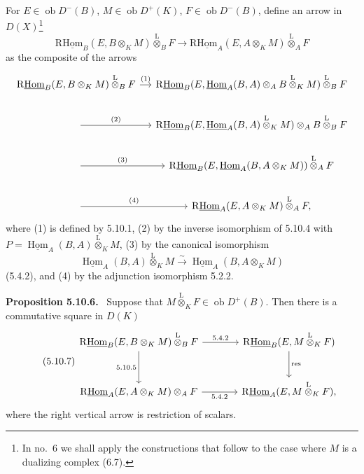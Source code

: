 \documentclass[11pt]{article}
\providecommand{\uHom}{\underline{\Hom}}
\newenvironment{statement}[1]{\par\medskip\noindent\textbf{#1.}\ }{\par\medskip}
\DeclareMathOperator{\Hom}{Hom}
\newcommand{\ob}{\operatorname{ob}}
\providecommand{\lten}{\overset{\mathrm L}{\otimes}}
\providecommand{\Hom}{\operatorname{Hom}}
\providecommand{\ob}{\operatorname{ob}}
\providecommand{\lten}{\overset{\mathrm L}{\otimes}}
\providecommand{\lten}{\overset{\mathrm L}{\otimes}}
\providecommand{\lten}{\overset{\mathrm L}{\otimes}}
\providecommand{\lten}{\overset{\mathrm L}{\otimes}}
\providecommand{\lten}{\overset{\mathrm L}{\otimes}}
\providecommand{\Hom}{\operatorname{Hom}}
\providecommand{\lten}{\overset{\mathrm L}{\otimes}}
\begin{document}
For $E\in\ob D^-(B)$, $M\in\ob D^+(K)$, $F\in\ob D^-(B)$, define an arrow in $D(X)$\footnote{In no.~6 we shall apply the constructions that follow to the case where $M$ is a dualizing complex (6.7).}
\begin{equation}\tag{5.10.5}
\mathrm{R}\underline{\mathrm{Hom}}_B(E,B\otimes_KM)\lten_BF\longrightarrow\mathrm{R}\underline{\mathrm{Hom}}_A(E,A\otimes_KM)\lten_AF
\end{equation}
as the composite of the arrows
\[
\begin{tikzcd}[column sep=small]
\mathrm{R}\underline{\mathrm{Hom}}_B(E,B\otimes_KM)\lten_BF \arrow[r,"(1)"] & \mathrm{R}\underline{\mathrm{Hom}}_B(E,\uHom_A(B,A)\otimes_AB\lten_KM)\lten_BF \\
\arrow[r,"(2)"] & \mathrm{R}\underline{\mathrm{Hom}}_B(E,\uHom_A(B,A)\lten_KM)\otimes_A B\lten_BF \\
\arrow[r,"(3)"] & \mathrm{R}\underline{\mathrm{Hom}}_B(E,\uHom_A(B,A\otimes_KM))\lten_AF \\
\arrow[r,"(4)"] & \mathrm{R}\underline{\mathrm{Hom}}_A(E,A\otimes_KM)\lten_AF,
\end{tikzcd}
\]
where (1) is defined by 5.10.1, (2) by the inverse isomorphism of 5.10.4 with $P=\uHom_A(B,A)\lten_KM$, (3) by the canonical isomorphism
\[
\uHom_A(B,A)\lten_KM\xrightarrow{\sim}\uHom_A(B,A\otimes_KM)
\]
(5.4.2), and (4) by the adjunction isomorphism 5.2.2.

\begin{statement}{Proposition 5.10.6}
Suppose that $M\lten_KF\in\ob D^+(B)$. Then there is a commutative square in $D(K)$
\begin{equation}\tag{5.10.7}
\begin{tikzcd}[column sep=large,row sep=large]
\mathrm{R}\underline{\mathrm{Hom}}_B(E,B\otimes_KM)\lten_BF \arrow[r,"5.4.2"] \arrow[d,"5.10.5"'] & \mathrm{R}\underline{\mathrm{Hom}}_B(E,M\lten_KF) \arrow[d,"\mathrm{res}"]\\
\mathrm{R}\underline{\mathrm{Hom}}_A(E,A\otimes_KM)\otimes_AF \arrow[r,"5.4.2"'] & \mathrm{R}\underline{\mathrm{Hom}}_A(E,M\lten_KF),
\end{tikzcd}
\end{equation}
where the right vertical arrow is restriction of scalars.
\end{statement}
\end{document}
